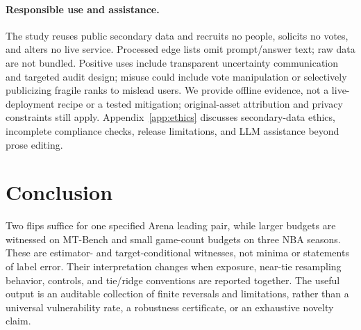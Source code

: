\documentclass{article}
\begin{document}
\paragraph{Responsible use and assistance.}
The study reuses public secondary data and recruits no people, solicits no votes, and alters no live service. Processed edge lists omit prompt/answer text; raw data are not bundled. Positive uses include transparent uncertainty communication and targeted audit design; misuse could include vote manipulation or selectively publicizing fragile ranks to mislead users. We provide offline evidence, not a live-deployment recipe or a tested mitigation; original-asset attribution and privacy constraints still apply. Appendix~\ref{app:ethics} discusses secondary-data ethics, incomplete compliance checks, release limitations, and LLM assistance beyond prose editing.

\section{Conclusion}
\label{sec:conclusion}
Two flips suffice for one specified Arena leading pair, while larger budgets are witnessed on MT-Bench and small game-count budgets on three NBA seasons. These are estimator- and target-conditional witnesses, not minima or statements of label error. Their interpretation changes when exposure, near-tie resampling behavior, controls, and tie/ridge conventions are reported together. The useful output is an auditable collection of finite reversals and limitations, rather than a universal vulnerability rate, a robustness certificate, or an exhaustive novelty claim.

\label{main-text-end}
\clearpage


\clearpage
\appendix

\clearpage

\end{document}
